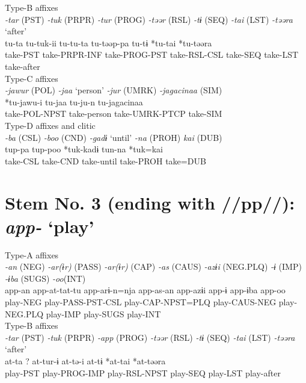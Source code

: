 \ex Type-B affixes\\
\glll \textit{-tar} (PST)  \textit{-tuk} (PRPR)  \textit{-tur} (PROG)  \textit{-təər} (RSL)  \textit{-tɨ} (SEQ)  \textit{-tai} (LST)  \textit{-təəra} ‘after’\\
tu-ta  tu-tuk-ii  tu-tu-ta  tu-təəp-pa  tu-tɨ  *tu-tai  *tu-təəra\\
take-PST  take-PRPR-INF  take-PROG-PST  take-RSL-CSL  take-SEQ  take-LST  take-after\\


\ex Type-C affixes\\
\glll \textit{-jawur} (POL)  \textit{-jaa} ‘person’  \textit{-jur} (UMRK)  \textit{-jagacinaa} (SIM)\\
*tu-jawu-i  tu-jaa  tu-ju-n  tu-jagacinaa\\
take-POL-NPST  take-person  take-UMRK-PTCP  take-SIM\\


\ex Type-D affixes and clitic\\
\glll \textit{-ba} (CSL)  \textit{-boo} (CND)  \textit{-gadɨ} ‘until’  \textit{-na} (PROH)  \textit{kai} (DUB)\\
tup-pa  tup-poo  *tuk-kadɨ  tun-na  *tuk=kai\\
take-CSL  take-CND  take-until  take-PROH  take=DUB\\
\z

\section{Stem No. 3 (ending with //pp//): \textit{app-} ‘play’}

\ea Type-A affixes\\
\glll \textit{-an} (NEG)  \textit{-ar(ɨr)} (PASS)  \textit{-ar(ɨr)} (CAP)  \textit{-as} (CAUS)  \textit{-azɨi} (NEG.PLQ)  \textit{-ɨ} (IMP)  \textit{-ɨba} (SUGS)  \textit{-oo}(INT)\\
app-an  app-at-tat-tu  app-arɨ-n=nja  app-as-an  app-azɨi  app-ɨ  app-ɨba  app-oo\\
play-NEG  play-PASS-PST-CSL  play-CAP-NPST=PLQ  play-CAUS-NEG  play-NEG.PLQ  play-IMP  play-SUGS  play-INT\\


\ex Type-B affixes\\
\glll \textit{-tar} (PST)  \textit{-tuk} (PRPR)  \textit{-app} (PROG)  \textit{-təər} (RSL)  \textit{-tɨ} (SEQ)  \textit{-tai} (LST)  \textit{-təəra} ‘after’\\
at-ta  ?  at-tur-ɨ  at-tə-i  at-tɨ  *at-tai  *at-təəra\\
play-PST    play-PROG-IMP  play-RSL-NPST  play-SEQ  play-LST  play-after\\



